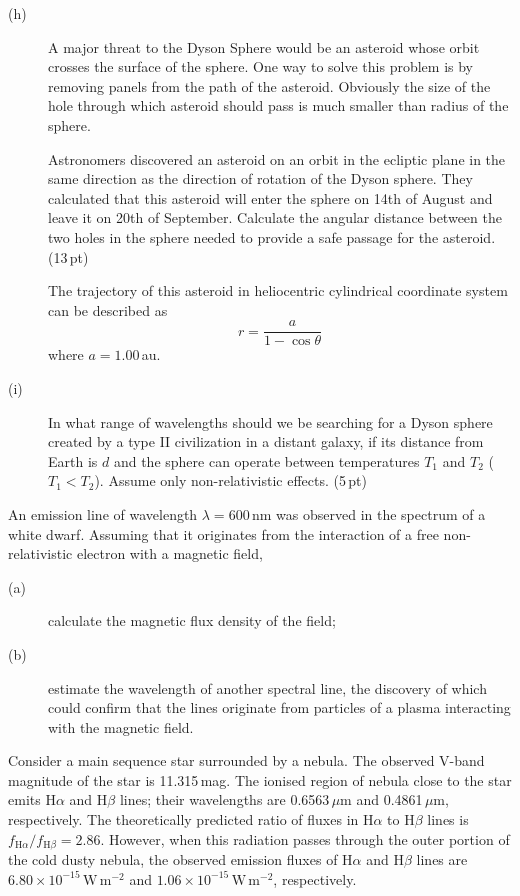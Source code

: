 \begin{description}
\item[(h)] A major threat to the Dyson Sphere would be an asteroid whose orbit
  crosses the surface of the sphere. One way to solve this problem is by
  removing panels from the path of the asteroid. Obviously the size of the
  hole through which asteroid should pass is much smaller than radius of the
  sphere.

  Astronomers discovered an asteroid on an orbit in the ecliptic plane in the
  same direction as the direction of rotation of the Dyson sphere. They
  calculated that this asteroid will enter the sphere on 14th of August and
  leave it on 20th of September. Calculate the angular distance between the
  two holes in the sphere needed to provide a safe passage for the asteroid.
  \hfill(13\,pt)

  The trajectory of this asteroid in heliocentric cylindrical coordinate
  system can be described as
  \[ r = \frac{a}{1 - \cos\theta} \]
  where $a = 1.00$\,au.
\item[(i)] In what range of wavelengths should we be searching for a Dyson
  sphere created by a type II civilization in a distant galaxy, if its
  distance from Earth is $d$ and the sphere can operate between temperatures
  $T_1$ and $T_2$ ($T_1 < T_2$). Assume only non-relativistic effects.
  \hfill(5\,pt)
\end{description}

An emission line of wavelength $\lambda = 600$\,nm was observed in the
spectrum of a white dwarf. Assuming that it originates from the interaction of
a free non-relativistic electron with a magnetic field,

\begin{description}
\item[(a)] calculate the magnetic flux density of the field;
\item[(b)] estimate the wavelength of another spectral line, the discovery of
  which could confirm that the lines originate from particles of a plasma
  interacting with the magnetic field.
\end{description}

Consider a main sequence star surrounded by a nebula. The observed V-band
magnitude of the star is 11.315\,mag. The ionised region of nebula close to
the star emits H$\alpha$ and H$\beta$ lines; their wavelengths are
0.6563\,$\mu$m and 0.4861\,$\mu$m, respectively. The theoretically predicted
ratio of fluxes in H$\alpha$ to H$\beta$ lines is
$f_{\mathrm{H}\alpha}/f_{\mathrm{H}\beta} = 2.86$. However, when this
radiation passes through the outer portion of the cold dusty nebula, the
observed emission fluxes of H$\alpha$ and H$\beta$ lines are
$6.80 \times 10^{-15}\,\mathrm{W\,m^{-2}}$ and
$1.06 \times 10^{-15}\,\mathrm{W\,m^{-2}}$, respectively.

